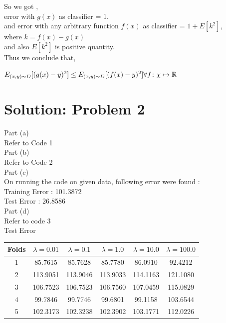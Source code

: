 \documentclass[twoside,10pt,a4paper]{article}
\theoremstyle{definition}
\theoremstyle{definition}
\theoremstyle{remark}
\renewcommand{\>}{{\rightarrow}}
\newcommand{\1}{{\mathbf 1}}
\newcommand{\0}{{\mathbf 0}}
\begin{document}
So we got ,\\
error with $g(x)$ as classifier = 1.\\
and error with any arbitrary function $f(x)$ as classifier = $1 + E[k^2]$,\\
where $k = f(x) - g(x) $ \\
and also $E[k^2]$ is positive quantity.\\
Thus we conclude that, \\

\begin{center}
$ E_{(x,y)\thicksim D} [ (g(x)-y)^2 ] \le E_{(x,y)\thicksim D} [ (f(x)-y)^2 ]  \forall f\colon \chi \mapsto \mathbb{R}$ \\
\end{center}




\section{Solution: Problem 2}

Part (a) \\

Refer to Code 1 \\

Part (b) \\

Refer to Code 2 \\

Part (c) \\

On running the code on given data, following error were found : \\

Training Error : 101.3872 \\
Test Error : 26.8586 \\

Part (d) \\
Refer to code 3\\
Test Error \\

\begin{center}
\begin{tabular}{|c| c| c | c | c | c|}
\hline
  Folds & $\lambda = 0.01$ & $\lambda = 0.1$ & $\lambda = 1.0 $ & $\lambda = 10.0$& $\lambda = 100.0$\\
\hline

1 & 85.7615  & 85.7628  & 85.7780  & 86.0910 &  92.4212 \\
\hline
2 & 113.9051 & 113.9046 & 113.9033 & 114.1163 & 121.1080 \\
\hline
3 & 106.7523 & 106.7523 & 106.7560 & 107.0459 & 115.0829 \\
\hline
4 & 99.7846  & 99.7746  & 99.6801  & 99.1158 & 103.6544 \\
\hline
5 & 102.3173 & 102.3238 & 102.3902 & 103.1771&  112.0226 \\
\hline
\end{tabular}
\end{center}
\end{document}
